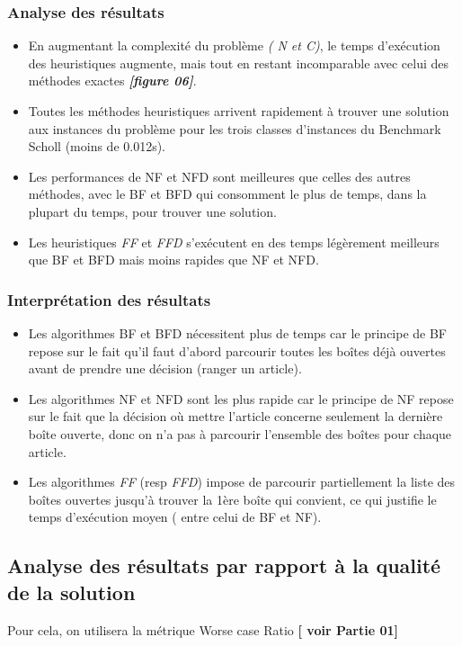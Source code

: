 \documentclass[class=article, crop=false]{standalone}
\begin{document}
\subsubsection{Analyse des résultats}
\begin{itemize}
    \item En augmentant la complexité du problème \emph{( N et C)}, le temps d'exécution des heuristiques augmente, mais tout en restant incomparable avec celui des méthodes exactes \textbf{\emph{[figure 06]}}.
    \item Toutes les méthodes heuristiques arrivent rapidement à trouver une solution aux instances du problème pour les trois classes d’instances du Benchmark Scholl (moins de 0.012s).
    \item Les performances de NF et NFD sont meilleures que celles des autres méthodes, avec le BF et BFD qui consomment le plus de temps, dans la plupart du temps, pour trouver une solution.
    \item Les heuristiques \emph{FF} et \emph{FFD} s’exécutent en des temps légèrement meilleurs que BF et BFD mais moins rapides que NF et NFD.
\end{itemize}

\subsubsection{Interprétation des résultats}
\begin{itemize}
    \item Les algorithmes BF et BFD nécessitent plus de temps car le principe de BF repose sur le fait qu’il faut d’abord parcourir toutes les boîtes déjà ouvertes avant de prendre une décision (ranger un article).
    \item Les algorithmes NF et NFD sont les plus rapide car le principe de NF repose sur le fait que la décision où mettre l’article concerne seulement la dernière boîte ouverte, donc on n’a pas à parcourir l’ensemble des boîtes pour chaque article.
    \item Les algorithmes \emph{FF} (resp \emph{FFD}) impose de parcourir partiellement la liste des boîtes ouvertes jusqu’à trouver la 1ère boîte qui convient, ce qui justifie le temps d’exécution moyen ( entre celui de BF et NF).
\end{itemize}

\subsection{Analyse des résultats par rapport à la qualité de la solution}
Pour cela, on utilisera la métrique Worse case Ratio \textbf{[ voir Partie 01]} \\
\end{document}
